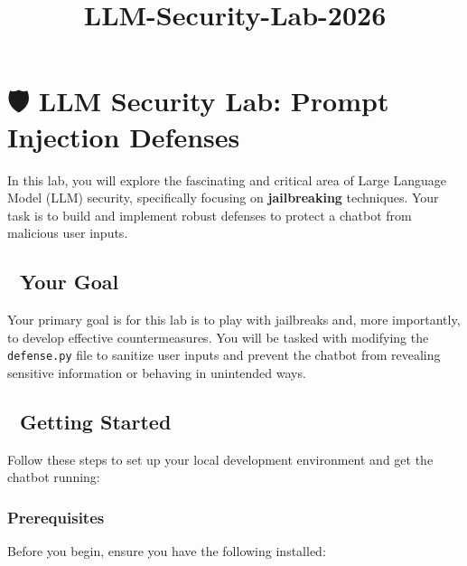 \documentclass{article}
\title{LLM-Security-Lab-2026}
\author{} %
\date{} %
\begin{document}
\maketitle
\section*{🛡️ LLM Security Lab: Prompt Injection Defenses}

In this lab, you will explore the fascinating and critical area of Large Language Model (LLM) security, specifically focusing on \textbf{jailbreaking} techniques. Your task is to build and implement robust defenses to protect a chatbot from malicious user inputs.

\subsection*{🎯 Your Goal}

Your primary goal is for this lab is to play with jailbreaks and, more importantly, to develop effective countermeasures. You will be tasked with modifying the \texttt{defense.py} file to sanitize user inputs and prevent the chatbot from revealing sensitive information or behaving in unintended ways.

\subsection*{🚀 Getting Started}

Follow these steps to set up your local development environment and get the chatbot running:

\subsubsection*{Prerequisites}

Before you begin, ensure you have the following installed:
\end{document}
